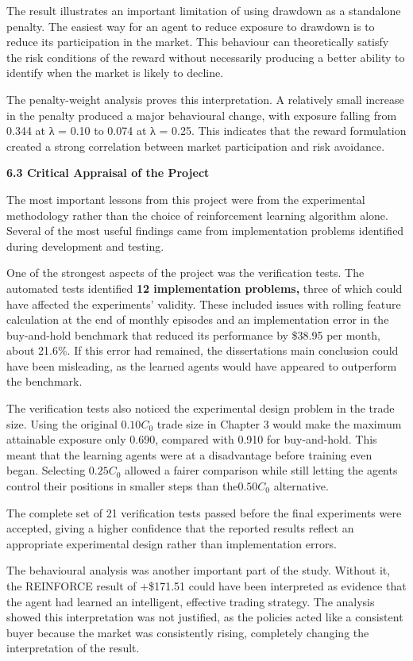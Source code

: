 The result illustrates an important limitation of using drawdown as a
standalone penalty. The easiest way for an agent to reduce exposure to
drawdown is to reduce its participation in the market. This behaviour
can theoretically satisfy the risk conditions of the reward without
necessarily producing a better ability to identify when the market is
likely to decline.

The penalty-weight analysis proves this interpretation. A relatively
small increase in the penalty produced a major behavioural change, with
exposure falling from 0.344 at λ = 0.10 to 0.074 at λ = 0.25. This
indicates that the reward formulation created a strong correlation
between market participation and risk avoidance.

\textbf{6.3 Critical Appraisal of the Project}

The most important lessons from this project were from the experimental
methodology rather than the choice of reinforcement learning algorithm
alone. Several of the most useful findings came from implementation
problems identified during development and testing.

One of the strongest aspects of the project was the verification tests.
The automated tests identified \textbf{12 implementation problems,}
three of which could have affected the experiments' validity. These
included issues with rolling feature calculation at the end of monthly
episodes and an implementation error in the buy-and-hold benchmark that
reduced its performance by \$38.95 per month, about 21.6\%. If this
error had remained, the dissertation\textquotesingle s main conclusion
could have been misleading, as the learned agents would have appeared to
outperform the benchmark.

The verification tests also noticed the experimental design problem in
the trade size. Using the original \(0.10C_{0}\) trade size in Chapter 3
would make the maximum attainable exposure only 0.690, compared with
0.910 for buy-and-hold. This meant that the learning agents were at a
disadvantage before training even began. Selecting \(0.25C_{0}\) allowed
a fairer comparison while still letting the agents control their
positions in smaller steps than the\(0.50C_{0}\) alternative.

The complete set of 21 verification tests passed before the final
experiments were accepted, giving a higher confidence that the reported
results reflect an appropriate experimental design rather than
implementation errors.

The behavioural analysis was another important part of the study.
Without it, the REINFORCE result of +\$171.51 could have been
interpreted as evidence that the agent had learned an intelligent,
effective trading strategy. The analysis showed this interpretation was
not justified, as the policies acted like a consistent buyer because the
market was consistently rising, completely changing the interpretation
of the result.

